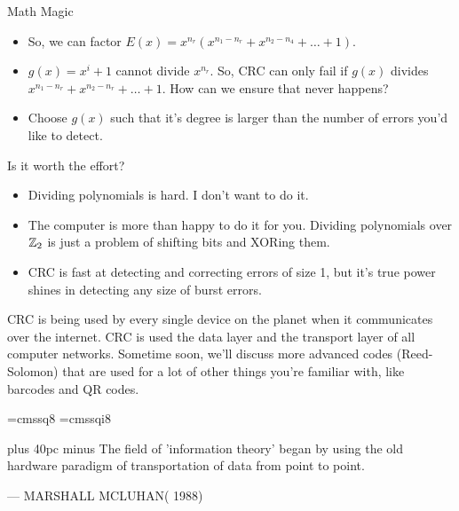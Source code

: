 \documentclass[aspectratio=169]{beamer}
\begin{document}
\begin{frame}{Math Magic}
    \begin{itemize}
        \item So, we can factor $E(x) = x^{n_r}(x^{n_1 - n_r} + x^{n_2 - n_4} + \ldots + 1)$. \pause 
        \item $g(x) = x^i + 1$ cannot divide $x^{n_r}$. So, CRC can only fail if $g(x)$ divides $x^{n_1 - n_r} + x^{n_2 - n_r} + \ldots + 1$. How can we ensure that never happens? \pause 
        \item Choose $g(x)$ such that it's degree is larger than the number of errors you'd like to detect.
    \end{itemize}


 
\end{frame}

\begin{frame}{Is it worth the effort?}
    \begin{itemize}
        \item Dividing polynomials is hard. I don't want to do it. \pause
        \item The computer is more than happy to do it for you. Dividing polynomials over $\mathbb{Z}_2$ is just a problem of shifting bits and XORing them. \pause
        \item CRC is fast at detecting and correcting errors of size 1, but it's true power shines in detecting any size of burst errors. \pause
    \end{itemize}

    CRC is being used by every single device on the planet when it communicates over the internet. CRC is used the data layer and the transport layer of all computer networks. Sometime soon, we'll discuss more advanced codes (Reed-Solomon) that are used for a lot of other things you're familiar with, like barcodes and QR codes. 
\end{frame}

\font\eightss=cmssq8
\font\eightssi=cmssqi8
\newcommand\quoteAuthorDate[3]{\begingroup
  \baselineskip 10pt
  \parfillskip 0pt
  \interlinepenalty 10000 %
  \leftskip 0pt plus 40pc minus \parindent
  \let\rm=\eightss
  \let\sl=\eightssi
  \everypar{\sl}#1\par
  \nobreak\smallskip
  \noindent\rm--- #2\unskip\enspace(#3)\par
  \endgroup}
\begin{frame}
    \begin{center}
        \item \quoteAuthorDate{The field of 'information theory' began by using the old hardware paradigm of transportation of data from point to point.}{MARSHALL MCLUHAN}{\color{sigma@mainblue} 1988}
    \end{center}
\end{frame}
\end{document}
